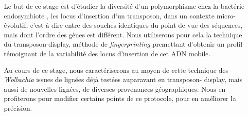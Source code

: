 Le but de ce stage est d'étudier la diversité d'un polymorphisme chez la
bactérie endosymbiote , les locus d'insertion d'un transposon,
dans un contexte micro-évolutif, c'est à dire entre des souches identiques du
point de vue des séquences, mais dont l'ordre des gènes est différent.
Nous utiliserons pour cela la technique du transposon-display, méthode de
\textit{fingerprinting} premettant d'obtenir un profil témoignant de la
variabilité des locus d'insertion de cet ADN mobile.

Au cours de ce stage, nous caractériserons au moyen de cette technique des
\textit{Wolbachia} issues de lignées déjà testées auparavant en transposon-%
display, mais aussi de nouvelles lignées, de diverses provenances
géographiques. Nous en profiterons pour modifier certains points de ce
protocole, pour en améliorer la précision.

